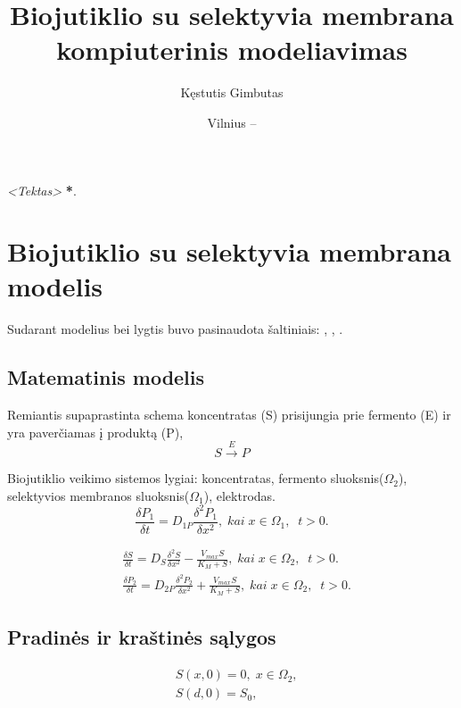 \documentclass[12pt, a4paper, lithuanian]{article}
\title{Biojutiklio su selektyvia membrana kompiuterinis modeliavimas}
\author{
   Kęstutis Gimbutas
}
\date{Vilnius – \the\year}
\begin{document}
\sloppy
\maketitle

\tableofcontents

\textit{<Tektas>} \textbf{*}.

\section{Biojutiklio su selektyvia membrana modelis}
Sudarant modelius bei lygtis buvo pasinaudota šaltiniais:
\cite{baronas2009mathematical}, \cite{baronas2006computational},
\cite{baronas2003influence}.

\subsection{Matematinis modelis}
Remiantis supaprastinta schema koncentratas (S) prisijungia prie fermento (E)
ir yra
paverčiamas į produktą (P),
\begin{equation}\label{eq:basic} 
    S \overset{E}{\rightarrow} P
\end{equation}

Biojutiklio veikimo sistemos lygiai: koncentratas, fermento sluoksnis($\Omega_2$),
selektyvios
membranos sluoksnis($\Omega_1$), elektrodas.
\begin{equation}
    \frac{\delta P_1}{\delta t} = D_{1P} \frac{\delta^2 P_1}{\delta x^2}, \;
    kai\; x \in \Omega_1,\;\; t > 0.
\end{equation}

\begin{equation}
\begin{aligned} 
    &\frac{\delta S}{\delta t} = D_S \frac{\delta^2 S}{\delta x^2} -
    \frac{V_{max} S}{K_M + S}, \; kai\; x \in \Omega_2,\;\; t > 0.  \\ 
    &\frac{\delta P_2}{\delta t} = D_{2P} \frac{\delta^2 P_2}{\delta x^2} +
    \frac{V_{max} S}{K_M + S}, \; kai\; x \in \Omega_2 ,\;\; t > 0.
\end{aligned}
\end{equation}


\subsection{Pradinės ir kraštinės sąlygos}
\begin{equation}
\begin{aligned}
    &S(x, 0) = 0,\; x \in \Omega_2,\\
    &S(d, 0) = S_0,
\end{aligned}
\end{equation}
\end{document}
